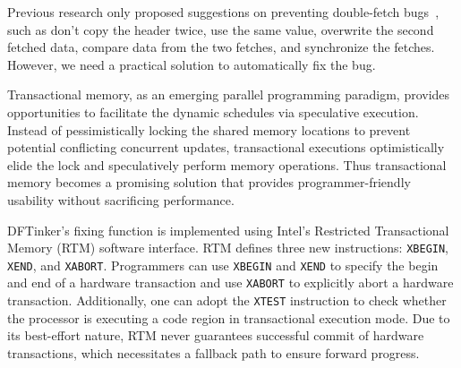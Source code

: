 \documentclass[10pt]{llncs}
\begin{document}
Previous research only proposed suggestions on preventing double-fetch bugs~\cite{wang, precise}, such as don't copy the header twice, use the same value, overwrite the second fetched data, compare data from the two fetches, and synchronize the fetches. However, we need a practical solution to automatically fix the bug.


Transactional memory, as an emerging parallel programming paradigm, provides opportunities to facilitate the dynamic schedules via speculative execution. Instead of pessimistically locking the shared memory locations to prevent potential conflicting concurrent updates, transactional executions optimistically elide the lock and speculatively perform memory operations. Thus transactional memory becomes a promising solution that provides programmer-friendly usability without sacrificing performance.

DFTinker's fixing function is implemented using Intel's Restricted Transactional Memory (RTM) software interface. RTM defines three new instructions: \verb:XBEGIN:, \verb:XEND:, and \verb:XABORT:. Programmers can use \verb:XBEGIN: and \verb:XEND: to specify the begin and end of a hardware transaction and use \verb:XABORT: to explicitly abort a hardware transaction. Additionally, one can adopt the \verb:XTEST: instruction to check whether the processor is executing a code region in transactional execution mode. Due to its best-effort nature, RTM never guarantees successful commit of hardware transactions, which necessitates a fallback path to ensure forward progress.
\end{document}
